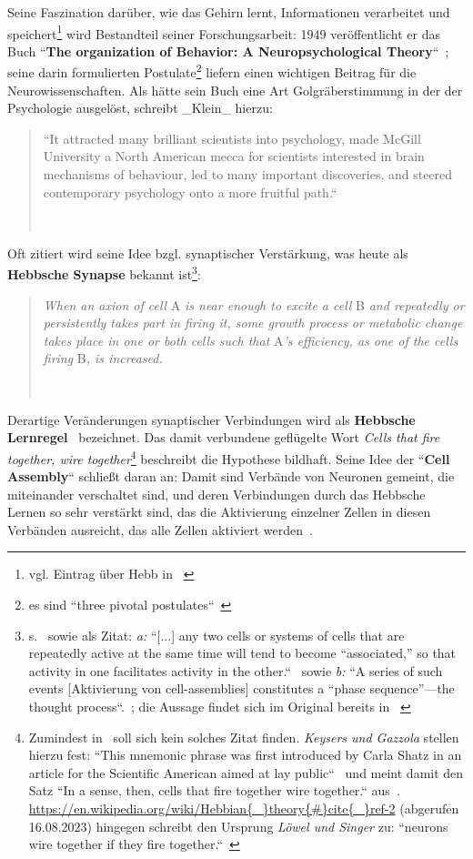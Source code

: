 Seine Faszination darüber, wie das Gehirn lernt, Informationen verarbeitet und speichert\footnote{vgl. Eintrag über Hebb in ~\cite[298 f.]{Str01}} wird Bestandteil seiner Forschungsarbeit: 1949 veröffentlicht er das Buch ``\textbf{The organization of Behavior: A Neuropsychological Theory}``~\cite{Heb49}; seine darin formulierten Postulate\footnote{
    es sind ``three pivotal postulates``~\cite[2]{Kle99}
} liefern einen wichtigen Beitrag für die Neurowissenschaften. Als hätte sein Buch eine Art Golgräberstimmung in der der Psychologie ausgelöst, schreibt _Klein_ hierzu:

\blockquote[{~\cite[2]{Kle99}}]{
    ``It attracted many
    brilliant scientists into psychology, made McGill University a North American mecca for scientists interested in brain mechanisms of behaviour, led to many important discoveries, and steered contemporary psychology onto a more fruitful path.``~\cite[1]{Kle99}
}

Oft zitiert wird seine Idee bzgl. synaptischer Verstärkung, was heute als \textbf{Hebbsche Synapse} bekannt ist\footnote{
    s.~\cite[43]{AR88} sowie als Zitat: \textit{a:} ``[...] any two cells or systems of cells that are repeatedly active at the same time will tend to become “associated,” so that activity in one facilitates activity in the other.``~\cite[52]{Heb88} sowie \textit{b:} ``A series of such events [Aktivierung von cell-assemblies] constitutes a “phase sequence”—the thought process``.~\cite[48]{Heb88}; die Aussage findet sich im Original bereits in ~\cite[xi-xix, ``Introduction``]{Heb49}
}:

\blockquote[{~\cite[50, Hervorhebung i.O.]{Heb88}}]{
    \textit{When an axion of cell} A \textit{is near enough to excite a cell} B \textit{and repeatedly or persistently takes part in firing it, some growth process or metabolic change takes place in one or both cells such that} A\textit{'s efficiency, as one of the cells firing} B\textit{, is increased.}
}


Derartige Veränderungen synaptischer Verbindungen wird als \textbf{Hebbsche Lernregel}~\cite[985]{BCP18} bezeichnet.
Das damit verbundene geflügelte Wort \textit{Cells that fire together, wire together}\footnote{
    Zumindest in~\cite{Heb49} soll sich kein solches Zitat finden. \textit{Keysers und Gazzola} stellen hierzu fest: ``This mnemonic phrase was first introduced by Carla Shatz in an article for the Scientific American aimed at lay public``~\cite[2, Fussnotenmarker entfernt]{KG14} und meint damit den Satz ``In a sense, then, cells that fire together wire together.`` aus~\cite[64]{Sha92}. \url{https://en.wikipedia.org/wiki/Hebbian{\_}theory{\#}cite{\_}ref-2} (abgerufen 16.08.2023) hingegen schreibt den Ursprung \textit{Löwel und Singer} zu: ``neurons wire together if they fire together.``~\cite[211]{LS92}
} beschreibt die Hypothese bildhaft.
Seine Idee der ``\textbf{Cell Assembly}`` schließt daran an: Damit sind Verbände von Neuronen gemeint, die miteinander verschaltet sind, und deren Verbindungen durch das Hebbsche Lernen so sehr verstärkt sind, das die Aktivierung einzelner Zellen in diesen Verbänden ausreicht, das alle Zellen aktiviert werden~\cite[907 f.]{BCP18}.



